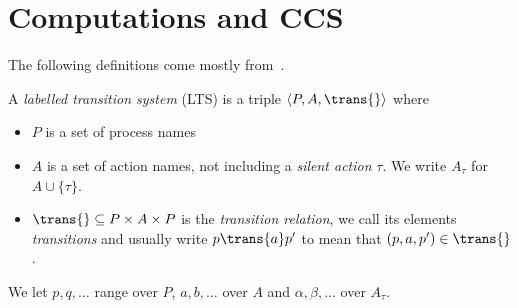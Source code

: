 \section{Computations and CCS} %
\label{sec:preliminaries}

The following definitions come mostly from~\cite{DeNicola:1990}.

\begin{definition}
    A \emph{labelled transition system} (LTS)
    is a triple $\langle P,A,\trans{}\rangle$ where
    \begin{itemize}
        \item $P$ is a set of process names
        \item $A$ is a set of action names, not including a \emph{silent action}
              $\tau$. We write $A_\tau$ for $A\cup \{\tau\}$.
        \item $\trans{}\subseteq P\times A\times P$ is the \emph{transition
              relation}, we call its elements \emph{transitions} and
              usually write $p\trans{a}p'$ to mean that $(p,a,p')\in\trans{}$.
    \end{itemize}
    We let $p,q,\dots$ range over $P$, $a,b,\dots$ over $A$ and $\alpha,\beta,\dots$
    over $A_\tau$.
\end{definition}

